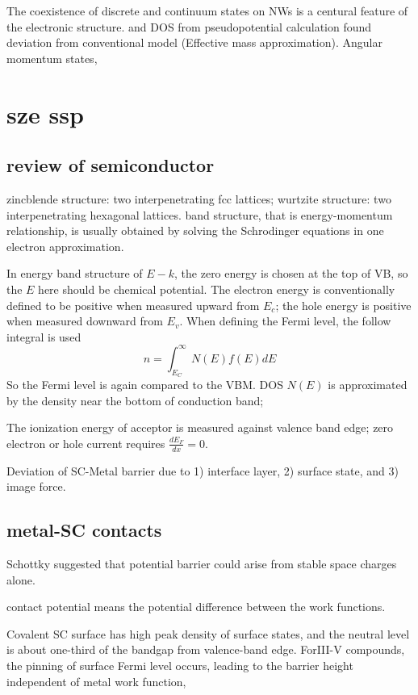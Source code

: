 The coexistence of discrete and continuum states on NWs is a centural feature of the electronic structure.  and DOS from pseudopotential calculation found deviation from conventional model (Effective mass approximation). Angular momentum states,  \cite{Wang2014n}


\section{sze ssp}
\subsection{review of semiconductor}
zincblende structure: two interpenetrating fcc lattices; wurtzite structure: two interpenetrating hexagonal lattices. band structure, that is energy-momentum relationship, is usually obtained by solving the Schrodinger equations in one electron approximation. 


In energy band structure of $E-k$, the zero energy is chosen at the top of VB, so the $E$ here should be chemical potential.\cite{Sze2006} The electron energy is conventionally defined to be positive when measured upward from $E_c$; the hole energy is positive when measured downward from $E_v$. When defining the Fermi level, the follow integral is used
\[
n = \int_{E_C}^\infty N(E)f(E)dE
\]
So the Fermi level is again compared to the VBM. DOS $N(E)$ is approximated by the density near the bottom of conduction band; 

The ionization energy of acceptor is measured against valence band edge;
zero electron or hole current requires $\frac{dE_F}{dx} = 0$. 

Deviation of SC-Metal barrier due to 1) interface layer, 2) surface state, and 3) image force. 


\subsection{metal-SC contacts}

Schottky suggested that potential barrier could arise from stable space charges alone. 

contact potential means the potential difference between the work functions. 

Covalent SC surface has high peak density of surface states, and the neutral level is about one-third of the bandgap from valence-band edge. ForIII-V compounds, the pinning of surface Fermi level occurs, leading to the barrier height independent of metal work function, 

